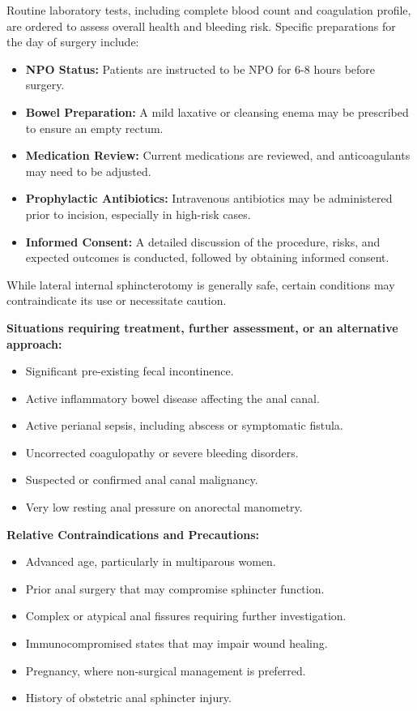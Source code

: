 Routine laboratory tests, including complete blood count and coagulation profile, are ordered to assess overall health and bleeding risk. Specific preparations for the day of surgery include:

\begin{itemize}
  \item \textbf{NPO Status:} Patients are instructed to be NPO for 6-8 hours before surgery.
  \item \textbf{Bowel Preparation:} A mild laxative or cleansing enema may be prescribed to ensure an empty rectum.
  \item \textbf{Medication Review:} Current medications are reviewed, and anticoagulants may need to be adjusted.
  \item \textbf{Prophylactic Antibiotics:} Intravenous antibiotics may be administered prior to incision, especially in high-risk cases.
  \item \textbf{Informed Consent:} A detailed discussion of the procedure, risks, and expected outcomes is conducted, followed by obtaining informed consent.
\end{itemize}

While lateral internal sphincterotomy is generally safe, certain conditions may contraindicate its use or necessitate caution.

\textbf{Situations requiring treatment, further assessment, or an alternative approach:}
\begin{itemize}
  \item Significant pre-existing fecal incontinence.
  \item Active inflammatory bowel disease affecting the anal canal.
  \item Active perianal sepsis, including abscess or symptomatic fistula.
  \item Uncorrected coagulopathy or severe bleeding disorders.
  \item Suspected or confirmed anal canal malignancy.
  \item Very low resting anal pressure on anorectal manometry.
\end{itemize}

\textbf{Relative Contraindications and Precautions:}
\begin{itemize}
  \item Advanced age, particularly in multiparous women.
  \item Prior anal surgery that may compromise sphincter function.
  \item Complex or atypical anal fissures requiring further investigation.
  \item Immunocompromised states that may impair wound healing.
  \item Pregnancy, where non-surgical management is preferred.
  \item History of obstetric anal sphincter injury.
\end{itemize}

